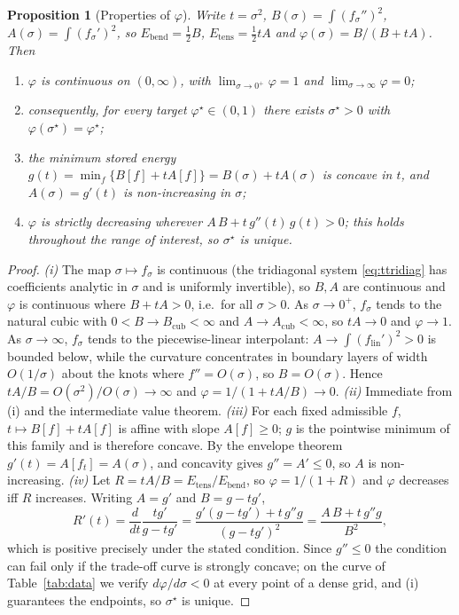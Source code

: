 \documentclass[10pt]{article}
\newtheorem{proposition}{Proposition}
\begin{document}
\begin{proposition}[Properties of $\varphi$]\label{prop:phi}
Write $t=\sigma^2$, $B(\sigma)=\int(f_\sigma'')^2$, $A(\sigma)=\int(f_\sigma')^2$, so
$E_{\mathrm{bend}}=\tfrac12 B$, $E_{\mathrm{tens}}=\tfrac12 t A$ and
$\varphi(\sigma)=B/(B+tA)$. Then
\begin{enumerate}[leftmargin=2em,itemsep=1pt]
\item[(i)] $\varphi$ is continuous on $(0,\infty)$, with $\lim_{\sigma\to0^+}\varphi=1$ and
$\lim_{\sigma\to\infty}\varphi=0$;
\item[(ii)] consequently, for every target $\varphi^\star\in(0,1)$ there exists
$\sigma^\star>0$ with $\varphi(\sigma^\star)=\varphi^\star$;
\item[(iii)] the minimum stored energy $g(t)=\min_f\{B[f]+tA[f]\}=B(\sigma)+tA(\sigma)$ is
concave in $t$, and $A(\sigma)=g'(t)$ is non-increasing in $\sigma$;
\item[(iv)] $\varphi$ is strictly decreasing wherever $A\,B+t\,g''(t)\,g(t)>0$; this holds
throughout the range of interest, so $\sigma^\star$ is unique.
\end{enumerate}
\end{proposition}
\begin{proof}
\emph{(i)} The map $\sigma\mapsto f_\sigma$ is continuous (the tridiagonal system
\eqref{eq:ttridiag} has coefficients analytic in $\sigma$ and is uniformly invertible), so
$B,A$ are continuous and $\varphi$ is continuous where $B+tA>0$, i.e.\ for all $\sigma>0$. As
$\sigma\to0^+$, $f_\sigma$ tends to the natural cubic with $0<B\to B_{\mathrm{cub}}<\infty$ and
$A\to A_{\mathrm{cub}}<\infty$, so $tA\to0$ and $\varphi\to1$. As $\sigma\to\infty$, $f_\sigma$
tends to the piecewise-linear interpolant: $A\to\int(f_{\mathrm{lin}}')^2>0$ is bounded below,
while the curvature concentrates in boundary layers of width $O(1/\sigma)$ about the knots where
$f''=O(\sigma)$, so $B=O(\sigma)$. Hence $tA/B=O(\sigma^2)/O(\sigma)\to\infty$ and
$\varphi=1/(1+tA/B)\to0$.
\emph{(ii)} Immediate from (i) and the intermediate value theorem.
\emph{(iii)} For each fixed admissible $f$, $t\mapsto B[f]+tA[f]$ is affine with slope
$A[f]\ge0$; $g$ is the pointwise minimum of this family and is therefore concave. By the
envelope theorem $g'(t)=A[f_t]=A(\sigma)$, and concavity gives $g''=A'\le0$, so $A$ is
non-increasing.
\emph{(iv)} Let $R=tA/B=E_{\mathrm{tens}}/E_{\mathrm{bend}}$, so $\varphi=1/(1+R)$ and $\varphi$
decreases iff $R$ increases. Writing $A=g'$ and $B=g-tg'$,
\[
R'(t)=\frac{d}{dt}\frac{tg'}{g-tg'}=\frac{g'(g-tg')+t\,g''g}{(g-tg')^2}=\frac{A\,B+t\,g''g}{B^2},
\]
which is positive precisely under the stated condition. Since $g''\le0$ the condition can fail
only if the trade-off curve is strongly concave; on the curve of Table~\ref{tab:data} we verify
$d\varphi/d\sigma<0$ at every point of a dense grid, and (i) guarantees the endpoints, so
$\sigma^\star$ is unique.
\end{proof}
\end{document}
